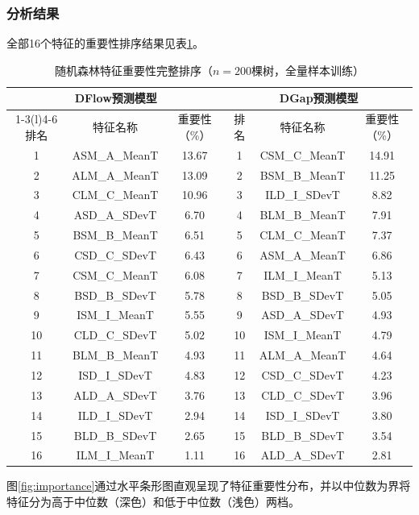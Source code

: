 \documentclass[UTF8,a4paper,12pt]{ctexart}
\begin{document}
\subsubsection{分析结果}

全部16个特征的重要性排序结果见表\ref{tab:rf-full}。

\begin{table}[H]
\centering
\caption{随机森林特征重要性完整排序（$n=200$棵树，全量样本训练）}
\label{tab:rf-full}
\begin{tabular}{cccccc}
\toprule
\multicolumn{3}{c}{DFlow预测模型} & \multicolumn{3}{c}{DGap预测模型} \\
\cmidrule(r){1-3}\cmidrule(l){4-6}
排名 & 特征名称 & 重要性（\%） & 排名 & 特征名称 & 重要性（\%） \\
\midrule
1  & ASM\_A\_MeanT & 13.67 & 1  & CSM\_C\_MeanT & 14.91 \\
2  & ALM\_A\_MeanT & 13.09 & 2  & BSM\_B\_MeanT & 11.25 \\
3  & CLM\_C\_MeanT & 10.96 & 3  & ILD\_I\_SDevT & 8.82 \\
4  & ASD\_A\_SDevT & 6.70  & 4  & BLM\_B\_MeanT & 7.91 \\
5  & BSM\_B\_MeanT & 6.51  & 5  & CLM\_C\_MeanT & 7.37 \\
6  & CSD\_C\_SDevT & 6.43  & 6  & ASM\_A\_MeanT & 6.86 \\
7  & CSM\_C\_MeanT & 6.08  & 7  & ILM\_I\_MeanT & 5.13 \\
8  & BSD\_B\_SDevT & 5.78  & 8  & BSD\_B\_SDevT & 5.05 \\
9  & ISM\_I\_MeanT & 5.55  & 9  & ASD\_A\_SDevT & 4.93 \\
10 & CLD\_C\_SDevT & 5.02  & 10 & ISM\_I\_MeanT & 4.79 \\
11 & BLM\_B\_MeanT & 4.93  & 11 & ALM\_A\_MeanT & 4.64 \\
12 & ISD\_I\_SDevT & 4.83  & 12 & CSD\_C\_SDevT & 4.23 \\
13 & ALD\_A\_SDevT & 3.76  & 13 & CLD\_C\_SDevT & 3.96 \\
14 & ILD\_I\_SDevT & 2.94  & 14 & ISD\_I\_SDevT & 3.80 \\
15 & BLD\_B\_SDevT & 2.65  & 15 & BLD\_B\_SDevT & 3.54 \\
16 & ILM\_I\_MeanT & 1.11  & 16 & ALD\_A\_SDevT & 2.81 \\
\bottomrule
\end{tabular}
\end{table}

图\ref{fig:importance}通过水平条形图直观呈现了特征重要性分布，并以中位数为界将特征分为高于中位数（深色）和低于中位数（浅色）两档。
\end{document}
